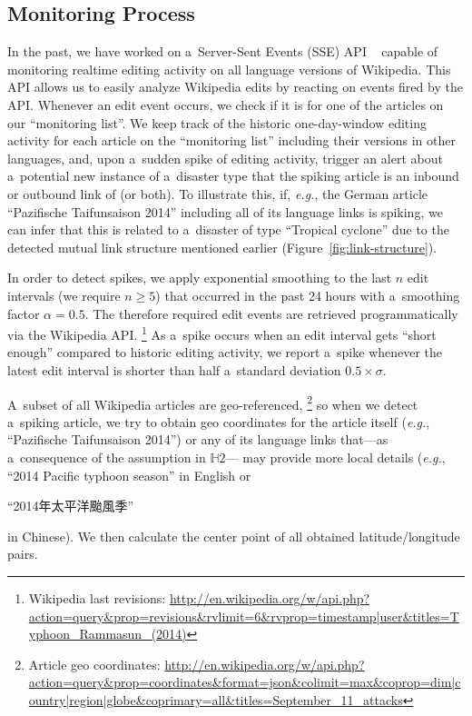 \documentclass[letterpaper]{article}
\begin{document}
\subsection{Monitoring Process}
\label{sec:monitoring-process}

In the past, we have worked on a~Server-Sent Events (SSE) API%
~\cite{steiner2014bots} capable of monitoring realtime editing activity
on all language versions of Wikipedia.
This API allows us to easily analyze Wikipedia edits
by reacting on events fired by the API.
Whenever an edit event occurs, we check if it is for one of the articles
on our ``monitoring list''. 
We keep track of the historic one-day-window editing activity
for each article on the ``monitoring list'' including their versions in other languages,
and, upon a~sudden spike of editing activity,
trigger an alert about a~potential new instance of a~disaster type
that the spiking article is an inbound or outbound link of (or both).
To illustrate this, if, \emph{e.g.}, the German article
``Pazifische Taifunsaison 2014'' including all of its language links is spiking,
we can infer that this is related to a~disaster
of type ``Tropical cyclone'' due to the detected
mutual link structure mentioned earlier (Figure~\ref{fig:link-structure}).

In order to detect spikes, we apply exponential smoothing
to the last $n$ edit intervals (we require $n\geq5$) that occurred in the past 24 hours
with a~smoothing factor $\alpha = 0.5$.
The therefore required edit events are retrieved programmatically via the Wikipedia API.%
\footnote{Wikipedia last revisions:
\url{http://en.wikipedia.org/w/api.php?action=query&prop=revisions&rvlimit=6&rvprop=timestamp|user&titles=Typhoon_Rammasun_(2014)}}
As a~spike occurs when an edit interval gets ``short enough''
compared to historic editing activity,
we report a~spike whenever the latest edit interval
is shorter than half a~standard deviation $0.5 \times \sigma$.

A~subset of all Wikipedia articles are geo-referenced,%
\footnote{Article geo coordinates:
\url{http://en.wikipedia.org/w/api.php?action=query&prop=coordinates&format=json&colimit=max&coprop=dim|country|region|globe&coprimary=all&titles=September_11_attacks}}
so when we detect a~spiking article,
we try to obtain geo coordinates for the article itself
(\emph{e.g.}, ``Pazifische Taifunsaison 2014'')
or any of its language links
that---as a~consequence of the assumption in $\mathbb{H}2$---%
may provide more local details
(\emph{e.g.}, ``2014 Pacific typhoon season'' in English or
\begin{CJK*}{UTF8}{gbsn}``2014年太平洋颱風季''\end{CJK*} in Chinese).
We then calculate the center point of all obtained latitude/longitude pairs.
\end{document}

